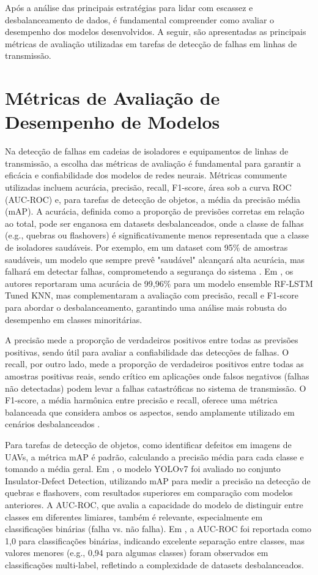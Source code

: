 Após a análise das principais estratégias para lidar com escassez e desbalanceamento de dados, é fundamental compreender como avaliar o desempenho dos modelos desenvolvidos. A seguir, são apresentadas as principais métricas de avaliação utilizadas em tarefas de detecção de falhas em linhas de transmissão.

\section{Métricas de Avaliação de Desempenho de Modelos}

Na detecção de falhas em cadeias de isoladores e equipamentos de linhas de transmissão, a escolha das métricas de avaliação é fundamental para garantir a eficácia e confiabilidade dos modelos de redes neurais. Métricas comumente utilizadas incluem acurácia, precisão, recall, F1-score, área sob a curva ROC (AUC-ROC) e, para tarefas de detecção de objetos, a média da precisão média (mAP). A acurácia, definida como a proporção de previsões corretas em relação ao total, pode ser enganosa em datasets desbalanceados, onde a classe de falhas (e.g., quebras ou flashovers) é significativamente menos representada que a classe de isoladores saudáveis. Por exemplo, em um dataset com 95\% de amostras saudáveis, um modelo que sempre prevê "saudável" alcançará alta acurácia, mas falhará em detectar falhas, comprometendo a segurança do sistema \cite{he2009learning}. Em , os autores reportaram uma acurácia de 99,96\% para um modelo ensemble RF-LSTM Tuned KNN, mas complementaram a avaliação com precisão, recall e F1-score para abordar o desbalanceamento, garantindo uma análise mais robusta do desempenho em classes minoritárias.

A precisão mede a proporção de verdadeiros positivos entre todas as previsões positivas, sendo útil para avaliar a confiabilidade das detecções de falhas. O recall, por outro lado, mede a proporção de verdadeiros positivos entre todas as amostras positivas reais, sendo crítico em aplicações onde falsos negativos (falhas não detectadas) podem levar a falhas catastróficas no sistema de transmissão. O F1-score, a média harmônica entre precisão e recall, oferece uma métrica balanceada que considera ambos os aspectos, sendo amplamente utilizado em cenários desbalanceados \cite{johnson2019survey}.

Para tarefas de detecção de objetos, como identificar defeitos em imagens de UAVs, a métrica mAP é padrão, calculando a precisão média para cada classe e tomando a média geral. Em , o modelo YOLOv7 foi avaliado no conjunto Insulator-Defect Detection, utilizando mAP para medir a precisão na detecção de quebras e flashovers, com resultados superiores em comparação com modelos anteriores. A AUC-ROC, que avalia a capacidade do modelo de distinguir entre classes em diferentes limiares, também é relevante, especialmente em classificações binárias (falha vs. não falha). Em , a AUC-ROC foi reportada como 1,0 para classificações binárias, indicando excelente separação entre classes, mas valores menores (e.g., 0,94 para algumas classes) foram observados em classificações multi-label, refletindo a complexidade de datasets desbalanceados.

